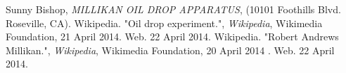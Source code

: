 \documentclass[twocolumn,secnumarabic,amssymb, nobibnotes, aps, pra]{revtex4}
\begin{document}
\begin{thebibliography}{5}
 Sunny Bishop, \textit{MILLIKAN OIL DROP APPARATUS}, (10101 Foothills Blvd. Roseville, CA).
 Wikipedia. "Oil drop experiment.", \textit{Wikipedia}, Wikimedia Foundation, 21 April 2014. Web. 22 April 2014.
 Wikipedia. "Robert Andrews Millikan.", \textit{Wikipedia}, Wikimedia Foundation, 20 April 2014 . Web. 22 April 2014.
\end{thebibliography}
\end{document}
